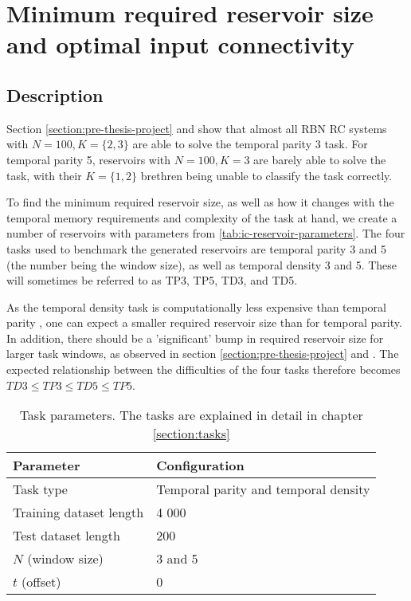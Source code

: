 \section{Minimum required reservoir size and optimal input connectivity}
\label{section:required_reservoir_size}

\subsection{Description}

Section \ref{section:pre-thesis-project} and \cite{burkow2015evolving}
show that almost all RBN RC systems with $N=100, K=\{2, 3\}$ are able to solve the temporal parity 3 task.
For temporal parity 5, reservoirs with $N=100, K=3$ are barely able to solve the task,
with their $K=\{1, 2\}$ brethren being unable to classify the task correctly.

To find the minimum required reservoir size, as well as how it changes with the temporal memory requirements and complexity of the task at hand,
we create a number of reservoirs with parameters from \ref{tab:ic-reservoir-parameters}.
The four tasks used to benchmark the generated reservoirs are temporal parity 3 and 5 (the number being the window size),
as well as temporal density 3 and 5.
These will sometimes be referred to as TP3, TP5, TD3, and TD5.

As the temporal density task is computationally less expensive than temporal parity \cite{rbn-reservoir},
one can expect a smaller required reservoir size than for temporal parity.
In addition, there should be a 'significant' bump in required reservoir size for larger task windows, as observed in section \ref{section:pre-thesis-project} and \cite{burkow2015evolving}.
The expected relationship between the difficulties of the four tasks therefore becomes $ TD3 \leq TP3 \leq TD5 \leq TP5 $.

\begin{table}[ht]
    \centering
    \caption{Task parameters. The tasks are explained in detail in chapter \ref{section:tasks}}
    \label{tab:tasks}
    \begin{tabular}{ll}
        \hline
        \textbf{Parameter} & \textbf{Configuration} \\
        \hline
        \hline
        Task type               & Temporal parity and temporal density \\
        Training dataset length & 4 000                       \\
        Test dataset length     & 200                         \\
        $N$ (window size)       & 3 and 5                     \\
        $t$ (offset)            & 0 \\
        \hline
    \end{tabular}
\end{table}

